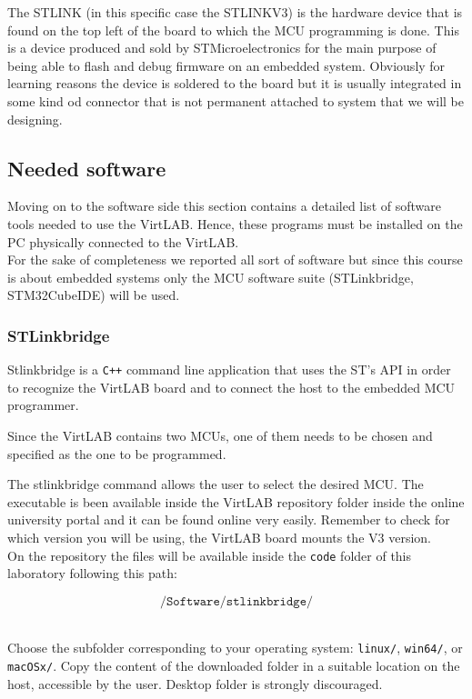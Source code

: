 \documentclass[../main.tex]{subfiles}
\begin{document}
The STLINK (in this specific case the STLINKV3) is the hardware device that is found on the top left of the board to which the MCU programming is done.
This is a device produced and sold by STMicroelectronics for the main purpose of being able to flash and debug firmware on an embedded system.
Obviously for learning reasons the device is soldered to the board but it is usually integrated in some kind od connector that is not permanent attached to system that we will be designing.\\

\subsection{Needed software}

Moving on to the software side this section contains a detailed list of software tools needed to use the VirtLAB. Hence, these programs must be installed on the PC physically connected to the VirtLAB.\\

For the sake of completeness we reported all sort of software but since this course is about embedded systems only the MCU software suite (STLinkbridge, STM32CubeIDE) will be used.\\

\subsubsection*{STLinkbridge}

Stlinkbridge is a \texttt{C++} command line application that uses the ST’s API in order to recognize the VirtLAB board and to connect the host to the embedded MCU programmer. 

Since the VirtLAB contains two MCUs, one of them needs to be chosen and specified as the one to be programmed. 

The stlinkbridge command allows the user to select the desired MCU. The executable is been  available inside the VirtLAB repository folder inside the online university portal and it can be found online very easily. Remember to check for which version you will be using, the VirtLAB board mounts the V3 version.\\

On the repository the files will be available inside the \texttt{code} folder of this laboratory following this path:

\[ \texttt{/Software/stlinkbridge/} \]\

Choose the subfolder corresponding to your operating system: \texttt{linux/}, \texttt{win64/}, or \texttt{macOSx/}. Copy the content of the downloaded folder in a suitable location on the host, accessible by the user. Desktop folder is strongly discouraged.\\
\end{document}
